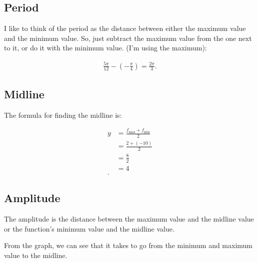 \begin{solution}
  \subsection*{Period}
  \label{sub_sec:period}

  I like to think of the period as the distance between either the maximum value
  and the minimum value. So, just subtract the maximum value from the one next
  to it, or do it with the minimum value. (I'm using the maximum):

  \begin{align*}
    \frac{5\pi}{12} - (-\frac{\pi}{4}) = \frac{2\pi}{3}
  .\end{align*}


  \subsection*{Midline}
  \label{sub_sec:midline}

  The formula for finding the midline is:

  \begin{align*}
    y &= \frac{f_{\textrm{max}} + f_{\textrm{min}}}{2} \\
      &= \frac{2 + (-10)}{2} \\
      &= \frac{8}{2} \\
      &= \boxed{4} \\
  .\end{align*}


  \subsection*{Amplitude}
  \label{sub_sec:amplitude}

  The amplitude is the distance between the maximum value and the midline value or the
  function's minimum value and the midline value.

  From the graph, we can see that it takes  to go from the
  minimum and maximum value to the midline.

\end{solution}
